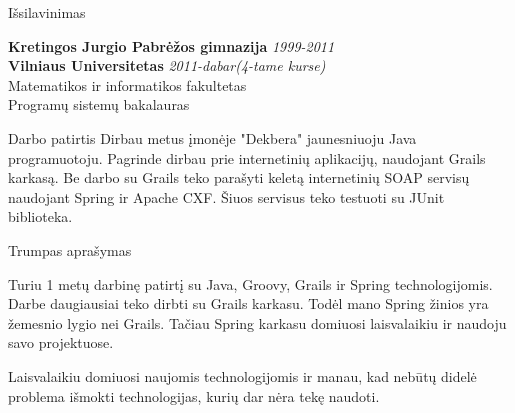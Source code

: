\documentclass[]{resume} %
\begin{document}

\begin{rSection}{Išsilavinimas}

{\bf Kretingos Jurgio Pabrėžos gimnazija} \hfill {\em 1999-2011} \\
{\bf Vilniaus Universitetas} \hfill {\em 2011-dabar(4-tame kurse)} \\
Matematikos ir informatikos fakultetas\\
Programų sistemų bakalauras\\

\end{rSection}

\begin{rSection}{Darbo patirtis}
Dirbau metus įmonėje "Dekbera" jaunesniuoju Java programuotoju.
Pagrinde dirbau prie internetinių aplikacijų, naudojant Grails karkasą.
Be darbo su Grails teko parašyti keletą internetinių SOAP servisų naudojant Spring ir Apache CXF.
Šiuos servisus teko testuoti su JUnit biblioteka.
\end{rSection}

\begin{rSection}{Trumpas aprašymas}

Turiu 1 metų darbinę patirtį su Java, Groovy, Grails ir Spring technologijomis.
Darbe daugiausiai teko dirbti su Grails karkasu. Todėl mano Spring žinios yra žemesnio
lygio nei Grails. Tačiau Spring karkasu domiuosi laisvalaikiu ir naudoju savo projektuose.

Laisvalaikiu domiuosi naujomis technologijomis ir manau, kad nebūtų didelė problema
išmokti technologijas, kurių dar nėra tekę naudoti.
\end{rSection}

\end{document}

